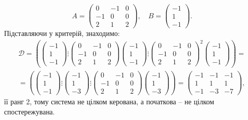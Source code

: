 \begin{solution}
	\[ A = \begin{pmatrix} 0 & -1 & 0 \\ -1 & 0 & 0 \\ 2 & 1 & 2 \end{pmatrix}, \quad B = \begin{pmatrix} -1 \\ 1 \\ -1 \end{pmatrix}. \] Підставляючи у критерій, знаходимо: \begin{multline*} \mathcal{D} = \left(\begin{pmatrix} -1 \\ 1 \\ -1 \end{pmatrix} \vdots \begin{pmatrix} 0 & -1 & 0 \\ -1 & 0 & 0 \\ 2 & 1 & 2 \end{pmatrix} \begin{pmatrix} -1 \\ 1 \\ -1 \end{pmatrix} \vdots \begin{pmatrix} 0 & -1 & 0 \\ -1 & 0 & 0 \\ 2 & 1 & 2 \end{pmatrix}^2 \begin{pmatrix} -1 \\ 1 \\ -1 \end{pmatrix} \right) = \\ 
	= \left(\begin{pmatrix} -1 \\ 1 \\ -1 \end{pmatrix} \vdots \begin{pmatrix} -1 \\ 1 \\ -3 \end{pmatrix} \vdots \begin{pmatrix} 0 & -1 & 0 \\ -1 & 0 & 0 \\ 2 & 1 & 2 \end{pmatrix} \begin{pmatrix} -1 \\ 1 \\ -3 \end{pmatrix} \right) = \begin{pmatrix} -1 & -1 & -1 \\ 1 & 1 & 1 \\ -1 & -3 & -7 \end{pmatrix}, \end{multline*} її ранг 2, тому система не цілком керована, а початкова -- не цілком спостережувана.
\end{solution}

